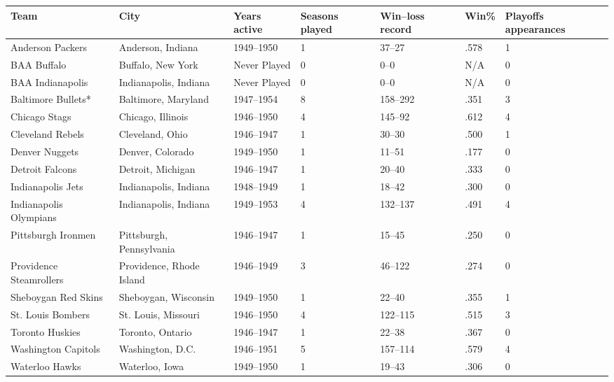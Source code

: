 \documentclass{article}
\begin{document}
\begin{tabular}{lllllll}
\toprule
Team & City & Years active & Seasons played & Win–loss record & Win\% & Playoffs appearances \\
\midrule
Anderson Packers & Anderson, Indiana & 1949–1950 & 1 & 37–27 & .578 & 1 \\
BAA Buffalo & Buffalo, New York & Never Played & 0 & 0–0 & N/A & 0 \\
BAA Indianapolis & Indianapolis, Indiana & Never Played & 0 & 0–0 & N/A & 0 \\
Baltimore Bullets* & Baltimore, Maryland & 1947–1954 & 8 & 158–292 & .351 & 3 \\
Chicago Stags & Chicago, Illinois & 1946–1950 & 4 & 145–92 & .612 & 4 \\
Cleveland Rebels & Cleveland, Ohio & 1946–1947 & 1 & 30–30 & .500 & 1 \\
Denver Nuggets & Denver, Colorado & 1949–1950 & 1 & 11–51 & .177 & 0 \\
Detroit Falcons & Detroit, Michigan & 1946–1947 & 1 & 20–40 & .333 & 0 \\
Indianapolis Jets & Indianapolis, Indiana & 1948–1949 & 1 & 18–42 & .300 & 0 \\
Indianapolis Olympians & Indianapolis, Indiana & 1949–1953 & 4 & 132–137 & .491 & 4 \\
Pittsburgh Ironmen & Pittsburgh, Pennsylvania & 1946–1947 & 1 & 15–45 & .250 & 0 \\
Providence Steamrollers & Providence, Rhode Island & 1946–1949 & 3 & 46–122 & .274 & 0 \\
Sheboygan Red Skins & Sheboygan, Wisconsin & 1949–1950 & 1 & 22–40 & .355 & 1 \\
St. Louis Bombers & St. Louis, Missouri & 1946–1950 & 4 & 122–115 & .515 & 3 \\
Toronto Huskies & Toronto, Ontario & 1946–1947 & 1 & 22–38 & .367 & 0 \\
Washington Capitols & Washington, D.C. & 1946–1951 & 5 & 157–114 & .579 & 4 \\
Waterloo Hawks & Waterloo, Iowa & 1949–1950 & 1 & 19–43 & .306 & 0 \\
\bottomrule
\end{tabular}
\end{document}
